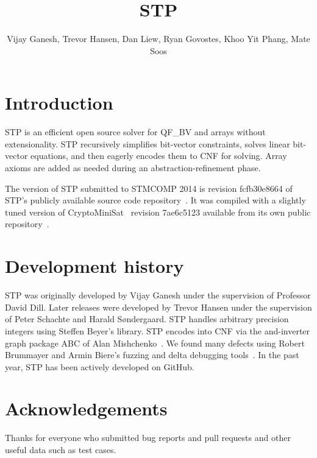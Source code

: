 \documentclass{llncs}
\begin{document}
\title{STP}
\author{Vijay Ganesh, Trevor Hansen, Dan Liew, Ryan Govostes, Khoo Yit Phang, Mate Soos}
\institute{}

\maketitle
\thispagestyle{empty}
\pagestyle{empty}

\section{Introduction}
STP\cite{Vijay:Thesis:2007} is an efficient open source solver for QF\_BV and arrays without extensionality. STP
recursively simplifies bit-vector constraints, solves linear bit-vector equations, and then eagerly encodes them to CNF
for solving. Array axioms are added as needed during an abstraction-refinement phase.

The version of STP submitted to STMCOMP 2014 is revision fcfb30e8664 of STP's publicly available source code
repository~\cite{STP:github}. It was compiled with a slightly tuned version of
CryptoMiniSat~\cite{DBLP:conf/sat/SoosNC09} revision 7ae6c5123 available from its own public
repository~\cite{CMS:github}.


\section{Development history}
STP was originally developed by Vijay Ganesh under the supervision of Professor David Dill. Later releases were
developed by Trevor Hansen under the supervision of Peter Schachte and Harald Søndergaard. STP handles arbitrary
precision integers using Steffen Beyer's library. STP encodes into CNF via the and-inverter graph package ABC of Alan
Mishchenko~\cite{Brayton:2010:AAI:2144310.2144317}. We found many defects using Robert Brummayer and Armin Biere's
fuzzing and delta debugging tools~\cite{Brummayer:2009:FDS:1670412.1670413}. In the past year, STP has been actively
developed on GitHub.

\section*{Acknowledgements}
Thanks for everyone who submitted bug reports and pull requests and other useful data such as test cases.




\vfill
\pagebreak
\end{document}
